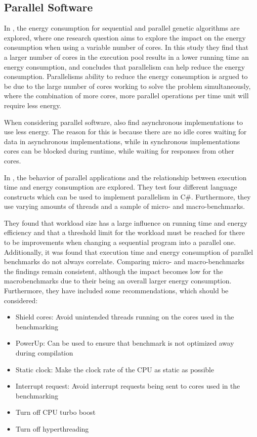 \subsection{Parallel Software}

In \cite{abdelhafez2019}, the energy consumption for sequential and parallel genetic algorithms are explored, where one research question aims to explore the impact on the energy consumption when using a variable number of cores. In this study they find that a larger number of cores in the execution pool results in a lower running time an energy consumption, and concludes that parallelism can help reduce the energy consumption. Parallelisms ability to reduce the energy consumption is argued to be due to the large number of cores working to solve the problem simultaneously, where the combination of more cores, more parallel operations per time unit will require less energy.

When considering parallel software, \cite{abdelhafez2019} also find asynchronous implementations to use less energy. The reason for this is because there are no idle cores waiting for data in asynchronous implementations, while in synchronous implementations cores can be blocked during runtime, while waiting for responses from other cores. 


In \cite{Lindholt}, the behavior of parallel applications and the relationship between execution time and energy consumption are explored. They test four different language constructs which can be used to implement parallelism in C\#. Furthermore, they use varying amounts of threads and a sample of micro- and macro-benchmarks. \cite{Lindholt}

They found that workload size has a large influence on running time and energy efficiency and that a threshold limit for the workload must be reached for there to be improvements when changing a sequential program into a parallel one.  Additionally, it was found that execution time and energy consumption of parallel benchmarks do not always correlate.  Comparing micro- and macro-benchmarks the findings remain consistent, although the impact becomes low for the macrobenchmarks due to their being an overall larger energy consumption. Furthermore, they have included some recommendations, which should be considered:\cite{Lindholt}

\begin{itemize}
    \item Shield cores: Avoid unintended threads running on the cores used in the benchmarking
    \item PowerUp: Can be used to ensure that benchmark is not optimized away during compilation
    \item Static clock: Make the clock rate  of the CPU as static as possible
    \item Interrupt request: Avoid interrupt requests being sent to cores used in the benchmarking 
    \item Turn off CPU turbo boost
    \item Turn off hyperthreading
\end{itemize}